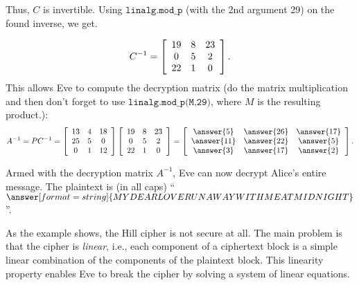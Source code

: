 \documentclass{ximera}
\begin{document}
\begin{example}
  Thus, $C$ is invertible. Using $\texttt{linalg.mod\_p}$ (with the 2nd argument 29) on the found inverse, we get.
  
  \begin{equation*}
    C^{-1}
    =
    \startmat{ccc}
      19 & 8 & 23 \\
      0 & 5 & 2 \\
      22 & 1 & 0 \\
    \stopmat.
  \end{equation*}
  This allows Eve to compute the decryption matrix (do the matrix multiplication and then don't forget to use $\texttt{linalg.mod\_p(M,29)}$, where $M$ is the resulting product.):
  \begin{equation*}
    A^{-1}
    =
    PC^{-1}
    =
    \startmat{ccc}
      13 & 4 & 18 \\
      25 & 5 & 0 \\
      0 & 1 & 12 \\
    \stopmat
    \startmat{ccc}
      19 & 8 & 23 \\
      0 & 5 & 2 \\
      22 & 1 & 0 \\
    \stopmat
    =
    \startmat{ccc}
    \answer{5} & \answer{26} & \answer{17} \\
    \answer{11} & \answer{22} & \answer{5} \\
    \answer{3} & \answer{17} & \answer{2}
    \stopmat.
  \end{equation*}

  Armed with the decryption matrix $A^{-1}$, Eve can now decrypt
  Alice's entire message. The plaintext is (in all caps) ``$\answer[format=string]{MY DEAR LOVE RUN AWAY WITH ME AT MIDNIGHT}$''.
\end{example}

As the example shows, the Hill cipher is not secure at all. The main
problem is that the cipher is {\em linear}, i.e., each component of a
ciphertext block is a simple linear combination of the components of
the plaintext block. This linearity property enables Eve to break the
cipher by solving a system of linear equations.
\end{document}
